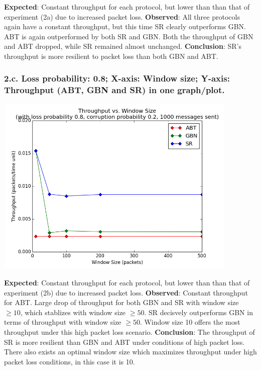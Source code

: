 \documentclass{article}
\begin{document}
\textbf{Expected}: Constant throughput for each protocol, but lower than than that of experiment (2a) due to increased packet loss.
\newline\newline
\textbf{Observed}: All three protocols again have a constant throughput, but this time SR clearly outperforms GBN. ABT is again outperformed by both SR and GBN. Both the throughput of GBN and ABT dropped, while SR remained almost unchanged.
\newline\newline
\textbf{Conclusion}: SR's throughput is more resilient to packet loss than both GBN and ABT.

\pagebreak

\subsubsection{2.c. Loss probability: 0.8; X-axis: Window size; Y-axis: Throughput (ABT, GBN and SR) in one graph/plot.}

\begin{center}
    \includegraphics[width=330pt,height=245pt]{images/exp2g3.png}
\end{center}

\textbf{Expected}: Constant throughput for each protocol, but lower than than that of experiment (2b) due to increased packet loss.
\newline\newline
\textbf{Observed}: Constant throughput for ABT. Large drop of throughput for both GBN and SR with window size $\ge 10$, which stablizes with window size $\ge 50$. SR decisvely outperforms GBN in terms of throughput with window size $\ge 50$. Window size 10 offers the most throughput under this high packet loss scenario.
\newline\newline
\textbf{Conclusion}: The throughput of SR is more resilient than GBN and ABT under conditions of high packet loss. There also exists an optimal window size which maximizes throughput under high packet loss conditions, in this case it is 10.
\end{document}
